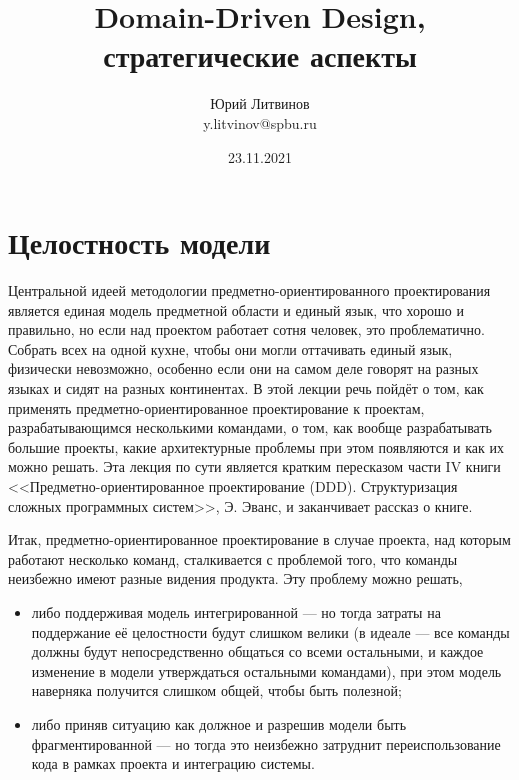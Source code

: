 \documentclass[a5paper]{article}
\title{Domain-Driven Design, стратегические аспекты}
\author{Юрий Литвинов\\\small{y.litvinov@spbu.ru}}
\date{23.11.2021}
\begin{document}
\maketitle
\thispagestyle{empty}

\section{Целостность модели}

Центральной идеей методологии предметно-ориентированного проектирования является единая модель предметной области и единый язык, что хорошо и правильно, но если над проектом работает сотня человек, это проблематично. Собрать всех на одной кухне, чтобы они могли оттачивать единый язык, физически невозможно, особенно если они на самом деле говорят на разных языках и сидят на разных континентах. В этой лекции речь пойдёт о том, как применять предметно-ориентированное проектирование к проектам, разрабатывающимся несколькими командами, о том, как вообще разрабатывать большие проекты, какие архитектурные проблемы при этом появляются и как их можно решать. Эта лекция по сути является кратким пересказом части IV книги <<Предметно-ориентированное проектирование (DDD). Структуризация сложных программных систем>>, Э. Эванс, и заканчивает рассказ о книге.

Итак, предметно-ориентированное проектирование в случае проекта, над которым работают несколько команд, сталкивается с проблемой того, что команды неизбежно имеют разные видения продукта. Эту проблему можно решать, 

\begin{itemize}
    \item либо поддерживая модель интегрированной --- но тогда затраты на поддержание её целостности будут слишком велики (в идеале --- все команды должны будут непосредственно общаться со всеми остальными, и каждое изменение в модели утверждаться остальными командами), при этом модель наверняка получится слишком общей, чтобы быть полезной;
    \item либо приняв ситуацию как должное и разрешив модели быть фрагментированной --- но тогда это неизбежно затруднит переиспользование кода в рамках проекта и интеграцию системы.
\end{itemize}
\end{document}
